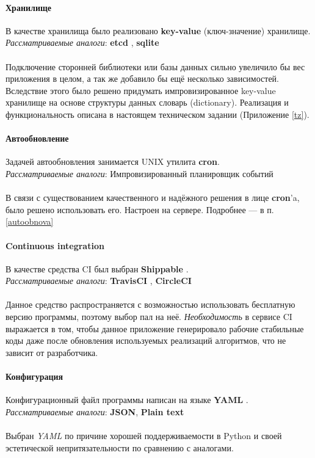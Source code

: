 \paragraph{Хранилище}
В качестве хранилища было реализовано \textbf{key-value} (ключ-значение) хранилище.\\
\emph{Рассматриваемые аналоги}: \textbf{etcd} \cite{etcd}, \textbf{sqlite} \cite{sqlite}\\\\
Подключение сторонней библиотеки или базы данных сильно увеличило бы вес
приложения в целом, а так же добавило бы ещё несколько зависимостей. Вследствие
этого было решено придумать импровизированное key-value хранилище на основе
структуры данных словарь (dictionary).
Реализация и функциональность описана в настоящем техническом задании
(Приложение \ref{tz}).

\paragraph{Автообновление}
Задачей автообновления занимается UNIX утилита \textbf{cron}.\\
\emph{Рассматриваемые аналоги}: Импровизированный планировщик событий\\\\
В связи с существованием качественного и надёжного решения в лице
\textbf{cron}'a, было решено использовать его. Настроен на сервере. Подробнее
--- в п. \ref{autoobnova}

\paragraph{Continuous integration}
В качестве средства CI был выбран \textbf{Shippable} \cite{shippable}.\\
\emph{Рассматриваемые аналоги}: \textbf{TravisCI} \cite{travisci}, \textbf{CircleCI} \cite{circleci}\\\\
Данное средство распространяется с возможностью использовать бесплатную версию
программы, поэтому выбор пал на неё. \emph{Необходимость} в сервисе CI
выражается в том, чтобы данное приложение генерировало рабочие стабильные коды
даже после обновления используемых реализаций алгоритмов, что не зависит от
разработчика.

\paragraph{Конфигурация}
Конфигурационный файл программы написан на языке \textbf{YAML} \cite{yaml}.\\
\emph{Рассматриваемые аналоги}: \textbf{JSON}, \textbf{Plain text}\\\\
Выбран \emph{YAML} по причине хорошей поддерживаемости в Python и своей эстетической
непритязательности по сравнению с аналогами.


